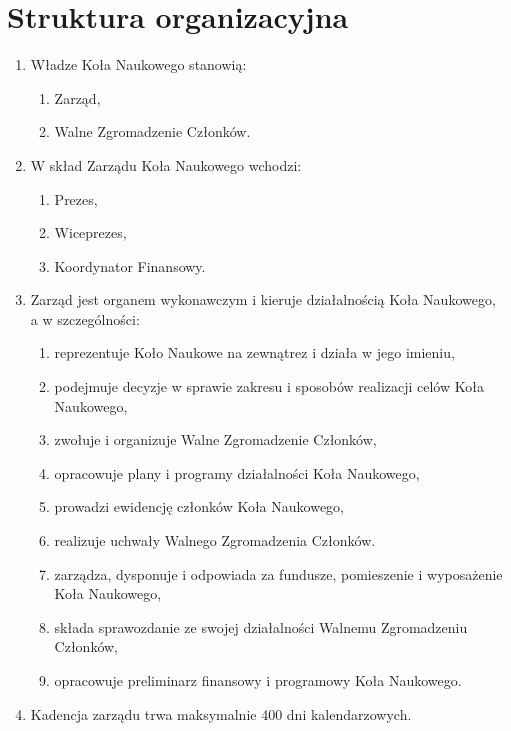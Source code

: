 \documentclass[12pt,a4paper]{article}
\begin{document}
    \section{Struktura organizacyjna}
    \begin{enumerate}
        \item Władze Koła Naukowego stanowią:
            \begin{enumerate}
                \item Zarząd,
                \item Walne Zgromadzenie Członków.
            \end{enumerate}
        \item W skład Zarządu Koła Naukowego wchodzi:
            \begin{enumerate}
                \item Prezes,
                \item Wiceprezes,
                \item Koordynator Finansowy.
            \end{enumerate}
        \item Zarząd jest organem wykonawczym i kieruje działalnością Koła Naukowego, \\ a w szczególności:
            \begin{enumerate}
                \item reprezentuje Koło Naukowe na zewnątrez i działa w jego imieniu,
                \item podejmuje decyzje w sprawie zakresu i sposobów realizacji celów Koła Naukowego,
                \item zwołuje i organizuje Walne Zgromadzenie Członków,
                \item opracowuje plany i programy działalności Koła Naukowego,
                \item prowadzi ewidencję członków Koła Naukowego,
                \item realizuje uchwały Walnego Zgromadzenia Członków.
                \item zarządza, dysponuje i odpowiada za fundusze, pomieszenie i wyposażenie Koła Naukowego,
                \item składa sprawozdanie ze swojej działalności Walnemu Zgromadzeniu Członków,
                \item opracowuje preliminarz finansowy i programowy Koła Naukowego.
            \end{enumerate}
        \item Kadencja zarządu trwa maksymalnie 400 dni kalendarzowych.

\end{enumerate}
\end{document}
